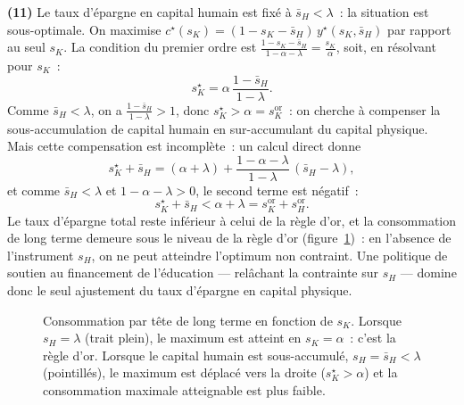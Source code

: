 \documentclass[11pt,a4paper,notitlepage]{article}
\begin{document}
\textbf{(11)} Le taux d'épargne en capital humain est fixé à
$\bar s_H<\lambda$~: la situation est sous-optimale. On maximise
$c^{\star}(s_K)=(1-s_K-\bar s_H)\,y^{\star}(s_K,\bar s_H)$ par rapport
au seul $s_K$. La condition du premier ordre est
$\frac{1-s_K-\bar s_H}{1-\alpha-\lambda} = \frac{s_K}{\alpha}$,
soit, en résolvant pour $s_K$~:
\[
s_K^{\star} = \alpha\,\frac{1-\bar s_H}{1-\lambda}.
\]
Comme $\bar s_H<\lambda$, on a $\frac{1-\bar s_H}{1-\lambda}>1$, donc
$s_K^{\star} > \alpha = s_K^{\mathrm{or}}$~: on cherche à compenser la
sous-accumulation de capital humain en sur-accumulant du capital
physique. Mais cette compensation est incomplète~: un calcul direct
donne
\[
s_K^{\star}+\bar s_H = (\alpha+\lambda) + \frac{1-\alpha-\lambda}{1-\lambda}\,(\bar s_H-\lambda),
\]
et comme $\bar s_H<\lambda$ et $1-\alpha-\lambda>0$, le second terme est
négatif~:
\[
s_K^{\star}+\bar s_H < \alpha+\lambda = s_K^{\mathrm{or}}+s_H^{\mathrm{or}}.
\]
Le taux d'épargne total reste inférieur à celui de la règle d'or, et
la consommation de long terme demeure sous le niveau de la règle d'or
(figure~\ref{fig:gold})~: en l'absence de l'instrument $s_H$, on ne
peut atteindre l'optimum non contraint. Une politique de soutien au
financement de l'éducation — relâchant la contrainte sur $s_H$ —
domine donc le seul ajustement du taux d'épargne en capital physique.

\begin{figure}[h]
\centering
{}
\caption{Consommation par tête de long terme en fonction de $s_K$.
  Lorsque $s_H=\lambda$ (trait plein), le maximum est atteint en
  $s_K=\alpha$~: c'est la règle d'or. Lorsque le capital humain est
  sous-accumulé, $s_H=\bar s_H<\lambda$ (pointillés), le maximum est
  déplacé vers la droite ($s_K^{\star}>\alpha$) et la consommation
  maximale atteignable est plus faible.}
\label{fig:gold}
\end{figure}
\end{document}
